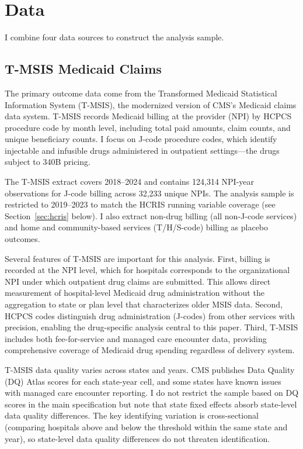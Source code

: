 \documentclass[12pt]{article}
\begin{document}
\section{Data}

I combine four data sources to construct the analysis sample.

\subsection{T-MSIS Medicaid Claims}

The primary outcome data come from the Transformed Medicaid Statistical Information System (T-MSIS), the modernized version of CMS's Medicaid claims data system. T-MSIS records Medicaid billing at the provider (NPI) by HCPCS procedure code by month level, including total paid amounts, claim counts, and unique beneficiary counts. I focus on J-code procedure codes, which identify injectable and infusible drugs administered in outpatient settings---the drugs subject to 340B pricing.

The T-MSIS extract covers 2018--2024 and contains 124,314 NPI-year observations for J-code billing across 32,233 unique NPIs. The analysis sample is restricted to 2019--2023 to match the HCRIS running variable coverage (see Section~\ref{sec:hcris} below). I also extract non-drug billing (all non-J-code services) and home and community-based services (T/H/S-code) billing as placebo outcomes.

Several features of T-MSIS are important for this analysis. First, billing is recorded at the NPI level, which for hospitals corresponds to the organizational NPI under which outpatient drug claims are submitted. This allows direct measurement of hospital-level Medicaid drug administration without the aggregation to state or plan level that characterizes older MSIS data. Second, HCPCS codes distinguish drug administration (J-codes) from other services with precision, enabling the drug-specific analysis central to this paper. Third, T-MSIS includes both fee-for-service and managed care encounter data, providing comprehensive coverage of Medicaid drug spending regardless of delivery system.

T-MSIS data quality varies across states and years. CMS publishes Data Quality (DQ) Atlas scores for each state-year cell, and some states have known issues with managed care encounter reporting. I do not restrict the sample based on DQ scores in the main specification but note that state fixed effects absorb state-level data quality differences. The key identifying variation is cross-sectional (comparing hospitals above and below the threshold within the same state and year), so state-level data quality differences do not threaten identification.
\end{document}
